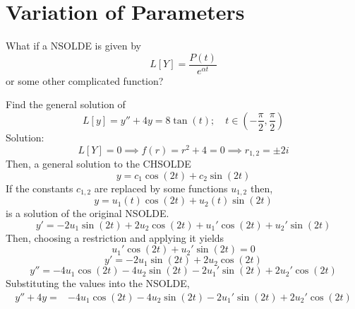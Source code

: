 \documentclass[twoside]{report}
\begin{document}
    \section{Variation of Parameters}
    What if a NSOLDE is given by
    \begin{equation}
        L[Y] = \frac{P(t)}{e^{\alpha t}}
    \end{equation}
    or some other complicated function?
    \begin{example}
        Find the general solution of
        \begin{equation}
            L[y] = y'' + 4y = 8\tan(t);\quad t\in\left(-\frac{\pi}{2}, \frac{\pi}{2}\right)
        \end{equation}
        Solution:
        \begin{equation}
            L[Y] = 0 \implies f(r) = r^{2} + 4 = 0 \implies r_{1,2} = \pm 2i
        \end{equation}
        Then, a general solution to the CHSOLDE
        \begin{equation}
            y = c_{1}\cos(2t) + c_{2}\sin(2t)
        \end{equation}
        If the constants $c_{1,2}$ are replaced by some functions $u_{1,2}$ then,
        \begin{equation}
            y = u_{1}(t)\cos(2t) + u_{2}(t)\sin(2t)
        \end{equation}
        is a solution of the original NSOLDE.
        \begin{equation}
            y' = -2u_{1}\sin(2t) + 2u_{2}\cos(2t)+u_{1}'\cos(2t)+u_{2}'\sin(2t)
        \end{equation}
        Then, choosing a restriction and applying it yields
        \begin{equation}
            u_{1}'\cos(2t) + u_{2}'\sin(2t) = 0
        \end{equation}
        \begin{equation}
            y' = -2u_{1}\sin(2t) + 2u_{2}\cos(2t)
        \end{equation}
        \begin{equation}
            y'' = -4u_{1}\cos(2t)-4u_{2}\sin(2t)-2u_{1}'\sin(2t)+2u_{2}'\cos(2t)
        \end{equation}
        Substituting the values into the NSOLDE,
        \begin{equation}
            \begin{alignedat}{1}
                y'' + 4y = &-4u_{1}\cos(2t) - 4u_{2}\sin(2t)-2u_{1}'\sin(2t)+2u_{2}'\cos(2t)\\

\end{alignedat}
\end{equation}
\end{example}
\end{document}
